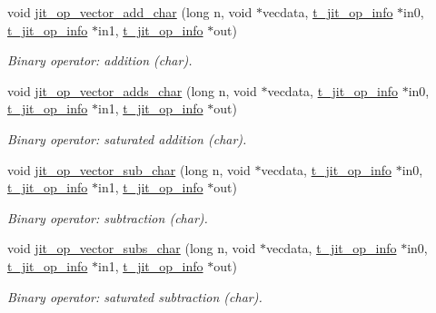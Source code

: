 \begin{DoxyCompactItemize}
void \hyperlink{group__opvecmod_gae0c74f1dda1702a203be0581ae2a9e3e}{jit\_\-op\_\-vector\_\-add\_\-char} (long n, void $\ast$vecdata, \hyperlink{structt__jit__op__info}{t\_\-jit\_\-op\_\-info} $\ast$in0, \hyperlink{structt__jit__op__info}{t\_\-jit\_\-op\_\-info} $\ast$in1, \hyperlink{structt__jit__op__info}{t\_\-jit\_\-op\_\-info} $\ast$out)
\begin{DoxyCompactList}\small\item\em Binary operator: addition (char). \item\end{DoxyCompactList}\item 
void \hyperlink{group__opvecmod_ga3a5f3fe93afa4f4042a943de3ec0124f}{jit\_\-op\_\-vector\_\-adds\_\-char} (long n, void $\ast$vecdata, \hyperlink{structt__jit__op__info}{t\_\-jit\_\-op\_\-info} $\ast$in0, \hyperlink{structt__jit__op__info}{t\_\-jit\_\-op\_\-info} $\ast$in1, \hyperlink{structt__jit__op__info}{t\_\-jit\_\-op\_\-info} $\ast$out)
\begin{DoxyCompactList}\small\item\em Binary operator: saturated addition (char). \item\end{DoxyCompactList}\item 
void \hyperlink{group__opvecmod_ga679a961f96238211a994318ac2ef9758}{jit\_\-op\_\-vector\_\-sub\_\-char} (long n, void $\ast$vecdata, \hyperlink{structt__jit__op__info}{t\_\-jit\_\-op\_\-info} $\ast$in0, \hyperlink{structt__jit__op__info}{t\_\-jit\_\-op\_\-info} $\ast$in1, \hyperlink{structt__jit__op__info}{t\_\-jit\_\-op\_\-info} $\ast$out)
\begin{DoxyCompactList}\small\item\em Binary operator: subtraction (char). \item\end{DoxyCompactList}\item 
void \hyperlink{group__opvecmod_gae838f44d5875c250bb4a79d2709d4feb}{jit\_\-op\_\-vector\_\-subs\_\-char} (long n, void $\ast$vecdata, \hyperlink{structt__jit__op__info}{t\_\-jit\_\-op\_\-info} $\ast$in0, \hyperlink{structt__jit__op__info}{t\_\-jit\_\-op\_\-info} $\ast$in1, \hyperlink{structt__jit__op__info}{t\_\-jit\_\-op\_\-info} $\ast$out)
\begin{DoxyCompactList}\small\item\em Binary operator: saturated subtraction (char). \item\end{DoxyCompactList}\item 

\end{DoxyCompactItemize}
